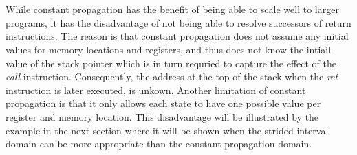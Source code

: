 \documentclass{kththesis}
\renewcommand{\it}[1]{\textit{#1}}
\begin{document}
\\ \\
While constant propagation has the benefit of being able to scale well to larger programs\cite{alternating}, it has the disadvantage of not being able to resolve successors of return instructions. The reason is that constant propagation does not assume any initial values for memory locations and registers, and thus does not know the intiail value of the stack pointer which is in turn requried to capture the effect of the \it{call} instruction. Consequently, the address at the top of the stack when the \it{ret} instruction is later executed, is unkown. Another limitation of constant propagation is that it only allows each state to have one possible value per register and memory location. This disadvantage will be illustrated by the example in the next section where it will be shown when the strided interval domain can be more appropriate than the constant propagation domain.
\end{document}
